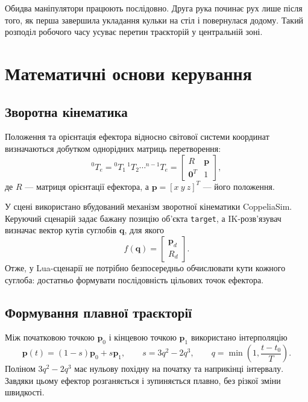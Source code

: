 \documentclass[12pt,a4paper]{article}
\begin{document}
Обидва маніпулятори працюють послідовно. Друга рука починає рух лише після
того, як перша завершила укладання кульки на стіл і повернулася додому.
Такий розподіл робочого часу усуває перетин траєкторій у центральній зоні.

\section{Математичні основи керування}

\subsection{Зворотна кінематика}

Положення та орієнтація ефектора відносно світової системи координат
визначаються добутком однорідних матриць перетворення:
\begin{equation}
  {}^{0}\!T_{e}
  ={}^{0}\!T_{1}\,{}^{1}\!T_{2}\cdots{}^{n-1}\!T_{e}
  =
  \begin{bmatrix}
    R & \mathbf{p} \\
    \mathbf{0}^{T} & 1
  \end{bmatrix},
\end{equation}
де \(R\) --- матриця орієнтації ефектора, а
\(\mathbf{p}=[x\ y\ z]^{T}\) --- його положення.

У сцені використано вбудований механізм зворотної кінематики CoppeliaSim.
Керуючий сценарій задає бажану позицію об'єкта \texttt{target}, а
IK-розв'язувач визначає вектор кутів суглобів
\(\mathbf{q}\), для якого
\begin{equation}
  f(\mathbf{q})=
  \begin{bmatrix}
    \mathbf{p}_{d} \\
    R_{d}
  \end{bmatrix}.
\end{equation}
Отже, у Lua-сценарії не потрібно безпосередньо обчислювати кути кожного
суглоба: достатньо формувати послідовність цільових точок ефектора.

\subsection{Формування плавної траєкторії}

Між початковою точкою \(\mathbf{p}_{0}\) і кінцевою точкою
\(\mathbf{p}_{1}\) використано інтерполяцію
\begin{equation}
  \mathbf{p}(t)=(1-s)\mathbf{p}_{0}+s\mathbf{p}_{1},
  \qquad
  s=3q^{2}-2q^{3},
  \qquad
  q=\min\left(1,\frac{t-t_{0}}{T}\right).
\end{equation}
Поліном \(3q^{2}-2q^{3}\) має нульову похідну на початку та наприкінці
інтервалу. Завдяки цьому ефектор розганяється і зупиняється плавно, без
різкої зміни швидкості.
\end{document}

